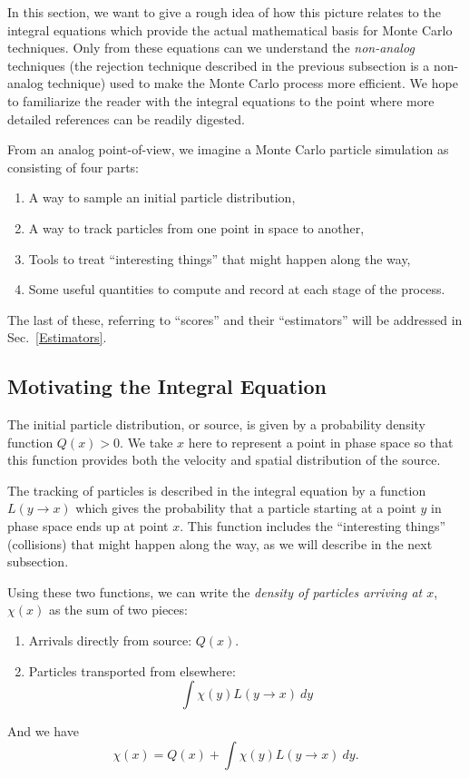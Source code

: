 \documentclass[12pt]{report}
\begin{document}
In this section, we want to give a rough idea of how this picture relates
to the integral equations which provide the actual mathematical basis
for Monte Carlo techniques. Only from these equations can we understand
the {\em non-analog} techniques (the rejection technique described in
the previous subsection is a non-analog technique) used to make the Monte 
Carlo process more efficient. We hope to familiarize the reader with
the integral equations to the point where more detailed 
references\cite{Span69,Reit92} can be readily digested.

From an analog point-of-view, we imagine a Monte Carlo particle simulation
as consisting of four parts:
\begin{enumerate}
\item A way to sample an initial particle distribution,
\item A way to track particles from one point in space to another,
\item Tools to treat ``interesting things'' that might happen along the way,
\item Some useful quantities to compute and record at each stage of the 
process.
\end{enumerate}
The last of these, referring to ``scores'' and their ``estimators'' will
be addressed in Sec.~\ref{Estimators}.

\subsection{Motivating the Integral Equation}

The initial particle distribution, or source, is given by a probability 
density function $Q(x) > 0$. We take $x$ here to represent a point in 
phase space so that this function provides both the velocity and spatial
distribution of the source. 

The tracking of particles is described in the integral equation by a function
$L(y \rightarrow x)$ which gives the probability that a particle starting 
at a point $y$
in phase space ends up at point $x$. This function includes the ``interesting
things'' (collisions) 
that might happen along the way, as we will describe in the next 
subsection.

Using these two functions, we can write the {\em density of particles
arriving at $x$}, $\chi(x)$ as the sum of two pieces:
\begin{enumerate}
  \item Arrivals directly from source: $Q(x)$.
  \item Particles transported from elsewhere: 
\begin{equation}
\int \chi(y) L(y \rightarrow x)  \: dy
\end{equation}
   \end{enumerate}
And we have
\begin{equation}
\chi(x) = Q(x) + \int \chi(y) L(y \rightarrow x)  \: dy.
\end{equation}
\end{document}
